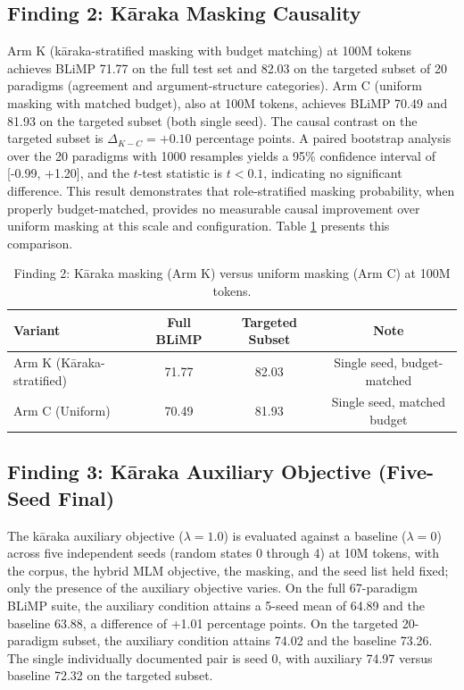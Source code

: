 \subsection{Finding 2: Kāraka Masking Causality}

Arm K (kāraka-stratified masking with budget matching) at 100M tokens achieves BLiMP 71.77 on the full test set and 82.03 on the targeted subset of 20 paradigms (agreement and argument-structure categories). Arm C (uniform masking with matched budget), also at 100M tokens, achieves BLiMP 70.49 and 81.93 on the targeted subset (both single seed). The causal contrast on the targeted subset is $\Delta_{K-C} = +0.10$ percentage points. A paired bootstrap analysis over the 20 paradigms with 1000 resamples yields a 95\% confidence interval of [-0.99, +1.20], and the $t$-test statistic is $t < 0.1$, indicating no significant difference. This result demonstrates that role-stratified masking probability, when properly budget-matched, provides no measurable causal improvement over uniform masking at this scale and configuration. Table \ref{tab:f2-results} presents this comparison.

\begin{table}[h]
\centering
\small
\caption{Finding 2: Kāraka masking (Arm K) versus uniform masking (Arm C) at 100M tokens.}
\label{tab:f2-results}
\begin{tabular}{lccc}
\toprule
Variant & Full BLiMP & Targeted Subset & Note \\
\midrule
Arm K (Kāraka-stratified) & 71.77 & 82.03 & Single seed, budget-matched \\
Arm C (Uniform) & 70.49 & 81.93 & Single seed, matched budget \\
\bottomrule
\end{tabular}
\end{table}

\subsection{Finding 3: Kāraka Auxiliary Objective (Five-Seed Final)}

The kāraka auxiliary objective ($\lambda=1.0$) is evaluated against a baseline ($\lambda=0$) across five independent seeds (random states 0 through 4) at 10M tokens, with the corpus, the hybrid MLM objective, the masking, and the seed list held fixed; only the presence of the auxiliary objective varies. On the full 67-paradigm BLiMP suite, the auxiliary condition attains a 5-seed mean of 64.89 and the baseline 63.88, a difference of +1.01 percentage points. On the targeted 20-paradigm subset, the auxiliary condition attains 74.02 and the baseline 73.26. The single individually documented pair is seed 0, with auxiliary 74.97 versus baseline 72.32 on the targeted subset.

